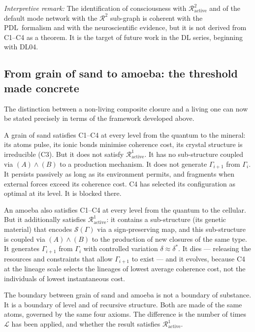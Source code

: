 \documentclass[12pt,a4paper]{article}
\theoremstyle{plain}
\theoremstyle{definition}
\theoremstyle{remark}
\newcommand{\PDL}{\textsc{PDL}}
\newcommand{\Sop}{\mathcal{S}}
\newcommand{\Rop}{\mathcal{R}}
\newcommand{\Lop}{\mathcal{L}}
\begin{document}
\emph{Interpretive remark:} The identification of consciousness with
$\Rop^2_{\mathrm{active}}$ and of the default mode network with the $\Rop^2$
sub-graph is coherent with the \PDL\ formalism and with the neuroscientific evidence,
but it is not derived from C1--C4 as a theorem. It is the target of future work in
the DL series, beginning with DL04.

\subsection{From grain of sand to amoeba: the threshold made concrete}

The distinction between a non-living composite closure and a living one can now be
stated precisely in terms of the framework developed above.

A grain of sand satisfies C1--C4 at every level from the quantum to the mineral: its
atoms pulse, its ionic bonds minimise coherence cost, its crystal structure is
irreducible (C3). But it does not satisfy $\Rop^1_{\mathrm{active}}$. It has no
sub-structure coupled via $(A)\wedge(B)$ to a production mechanism. It does not
generate $\Gamma_{i+1}$ from $\Gamma_i$. It persists passively as long as its
environment permits, and fragments when external forces exceed its coherence cost.
C4 has selected its configuration as optimal at its level. It is blocked there.

An amoeba also satisfies C1--C4 at every level from the quantum to the cellular.
But it additionally satisfies $\Rop^1_{\mathrm{active}}$: it contains a sub-structure
(its genetic material) that encodes $\Sop(\Gamma)$ via a sign-preserving map, and
this sub-structure is coupled via $(A)\wedge(B)$ to the production of new closures
of the same type. It generates $\Gamma_{i+1}$ from $\Gamma_i$ with controlled
variation $\delta \approx \delta^{*}$. It dies --- releasing the resources and
constraints that allow $\Gamma_{i+1}$ to exist --- and it evolves, because C4 at
the lineage scale selects the lineages of lowest average coherence cost, not the
individuals of lowest instantaneous cost.

The boundary between grain of sand and amoeba is not a boundary of substance. It
is a boundary of level and of recursive structure. Both are made of the same atoms,
governed by the same four axioms. The difference is the number of times $\Lop$ has
been applied, and whether the result satisfies $\Rop^1_{\mathrm{active}}$.

\end{document}
